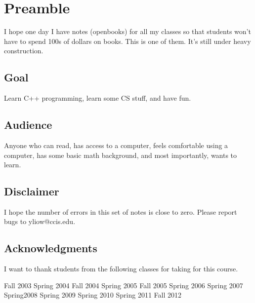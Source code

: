 \chapter{Preamble}

I hope one day I have notes (openbooks) for all my classes so that students won't have to spend 100s of dollars on books. This is one of them. It's still under heavy construction.


\section{Goal}
Learn C++ programming, learn some CS stuff, and have fun.


\section{Audience}
Anyone who can read, has access to a computer, feels comfortable using a computer, has some basic math background, and most importantly, wants to learn.


\section{Disclaimer}
I hope the number of errors in this set of notes is close to zero. Please report bugs to yliow@ccis.edu.


\section{Acknowledgments}

I want to thank students from the following classes for taking for this course.
\begin{tightlist}
\li Fall 2003
\li Spring 2004
\li Fall 2004
\li Spring 2005
\li Fall 2005
\li Spring 2006
\li Spring 2007
\li Spring2008
\li Spring 2009
\li Spring 2010
\li Spring 2011
\li Fall 2012
\end{tightlist}
